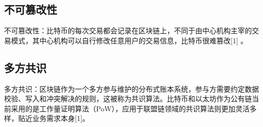 \subsection{不可篡改性}
不可篡改性：比特币的每次交易都会记录在区块链上，不同于由中心机构主宰的交易模式，其中心机构可以自行修改任意用户的交易信息，比特币很难篡改[1] 。

\subsection{多方共识}
多方共识：区块链作为一个多方参与维护的分布式账本系统，参与方需要约定数据校验、写入和冲突解决的规则，这被称为共识算法。比特币和以太坊作为公有链当前采用的是工作量证明算法（PoW），应用于联盟链领域的共识算法则更加灵活多样，贴近业务需求本身[1]。 








